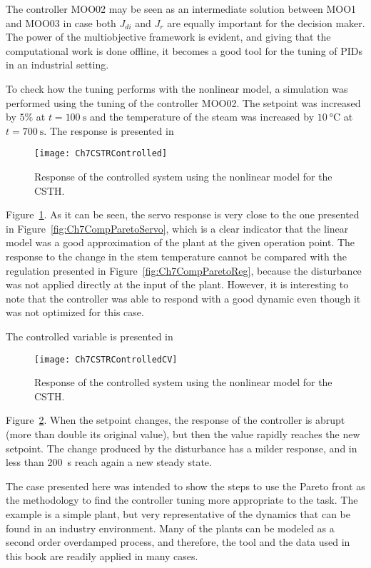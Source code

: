 The controller MOO02 may be seen as an intermediate solution between MOO1 and MOO03 in case both $J_{di}$ and $J_r$ are equally important for the decision maker. The power of the multiobjective framework is evident, and giving that the computational work is done offline, it becomes a good tool for the tuning of PIDs in an industrial setting.

To check how the tuning performs with the nonlinear model, a simulation was performed using the tuning of the controller MOO02. The setpoint was increased by $5\%$ at $t=\SI{100}{\second}$ and the temperature of the steam was increased by $\SI{10}{\celsius}$ at $t=\SI{700}{\second}$. The response is presented in %
\begin{figure}[tb]
	\centering
	\texttt{[image: Ch7CSTRControlled]}
	\caption{Response of the controlled system using the nonlinear model for the CSTH.}
	\label{fig:Ch7CSTRControlled}
\end{figure}
%
Figure~\ref{fig:Ch7CSTRControlled}. As it can be seen, the servo response is very close to the one presented in Figure~\ref{fig:Ch7CompParetoServo}, which is a clear indicator that the linear model was a good approximation of the plant at the given operation point. The response to the change in the stem temperature cannot be compared with the regulation presented in Figure~\ref{fig:Ch7CompParetoReg}, because the disturbance was not applied directly at the input of the plant. However, it is interesting to note that the controller was able to respond with a good dynamic even though it was not optimized for this case.

The controlled variable is presented in %
\begin{figure}[tb]
	\centering
	\texttt{[image: Ch7CSTRControlledCV]}
	\caption{Response of the controlled system using the nonlinear model for the CSTH.}
	\label{fig:Ch7CSTRControlledCV}
\end{figure}
%
Figure~\ref{fig:Ch7CSTRControlledCV}. When the setpoint changes, the response of the controller is abrupt (more than double its original value), but then the value rapidly reaches the new setpoint. The change produced by the disturbance has a milder response, and in less than \SI{200}{\second} reach again a new steady state.

The case presented here was intended to show the steps to use the Pareto front as the methodology to find the controller tuning more appropriate to the task. The example is a simple plant, but very representative of the dynamics that can be found in an industry environment. Many of the plants can be modeled as a second order overdamped process, and therefore, the tool and the data used in this book are readily applied in many cases.

